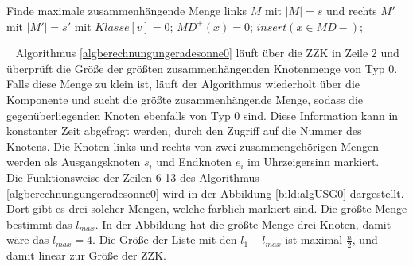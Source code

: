 \begin{algorithm}
\caption{$USG1(x)$}
\begin{algorithmic}[1]
\vspace{2mm} 
	\STATE Finde maximale zusammenhängende Menge links $M$ mit $|M|=s$ und rechts $M'$ mit $|M'|=s'$ mit 			$Klasse[v]=0$;
	\ENDIF
{} 
	\ENDIF 
{}  \STATE $MD^+(x)=0$;
									 	\STATE $insert(x \in MD-)$;\ENDIF
\vspace{2mm}
\end{algorithmic}
\label{algberechnunggeradesonne1}
\end{algorithm}
\vspace{-3mm}
~\linebreak
Algorithmus \ref{algberechnungungeradesonne0} läuft über die ZZK in Zeile 2 und überprüft die Größe der größten zusammenhängenden Knotenmenge von Typ $0$. Falls diese Menge zu klein ist, läuft der Algorithmus wiederholt über die Komponente und sucht die größte zusammenhängende Menge, sodass die gegenüberliegenden Knoten ebenfalls von Typ $0$ sind. Diese Information kann in konstanter Zeit abgefragt werden, durch den Zugriff auf die Nummer des Knotens. Die Knoten links und rechts von zwei zusammengehörigen Mengen werden als Ausgangsknoten $s_i$ und Endknoten $e_i$ im Uhrzeigersinn markiert.\\
Die Funktionsweise der Zeilen 6-13 des Algorithmus \ref{algberechnungungeradesonne0} wird in der Abbildung \ref{bild:algUSG0} dargestellt. Dort gibt es drei solcher Mengen, welche farblich markiert sind. Die größte Menge bestimmt das $l_{max}$. In der Abbildung hat die größte Menge drei Knoten, damit wäre das $l_{max}=4$. Die Größe der Liste mit den $l_1-l_{max}$ ist maximal $\frac{n}{2}$, und damit linear zur Größe der ZZK.
\newpage
